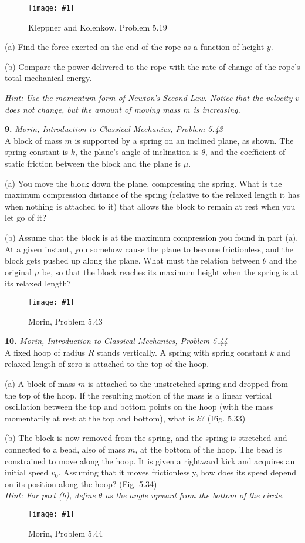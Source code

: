 \documentclass[11pt]{article}
\newcommand{\fig}[4]{
    \begin{figure}[H]
        \centering
        \texttt{[image: \#1]}
        \caption{#2}
        \label{exp4fit}
    \end{figure}
}
\theoremstyle{gangnamstyle}{\newtheorem{definition}{Definition}[]}
\theoremstyle{gangnamstyle}{\newtheorem{example}{Example}[]}
\theoremstyle{gangnamstyle}{\newtheorem{problem}{Problem}[]}
\begin{document}
\fig{figs/0716/kk519.png}{Kleppner and Kolenkow, Problem 5.19}{0.5}{0}

(a) Find the force exerted on the end of the rope as a function of height $y$. 

(b) Compare the power delivered to the rope with the rate of change of the rope’s total mechanical energy. 

\textit{Hint: Use the momentum form of Newton's Second Law. Notice that the velocity $v$ does not change, but the amount of moving mass $m$ is increasing. }

\pagebreak

\textbf{9.} \textit{Morin, Introduction to Classical Mechanics, Problem 5.43} \\
A block of mass $m$ is supported by a spring on an inclined plane, as shown. The spring constant is $k$, the plane’s angle of inclination is $\theta$, and the coefficient of static friction between the block and the plane is $\mu$.

(a) You move the block down the plane, compressing the spring. What is the maximum compression distance of the spring (relative to the relaxed length it has when nothing is attached to it) that allows the block to remain at rest when you let go of it?

(b) Assume that the block is at the maximum compression you found in part (a). At a given instant, you somehow cause the plane to become frictionless, and the block gets pushed up along the plane. What must the relation between $\theta$ and the original $\mu$ be, so that the block reaches its maximum height when the spring is at its relaxed length?
\fig{figs/0716/m543.png}{Morin, Problem 5.43}{0.65}{0}

\pagebreak

\textbf{10.} \textit{Morin, Introduction to Classical Mechanics, Problem 5.44} \\
A fixed hoop of radius $R$ stands vertically. A spring with spring constant $k$ and relaxed length of zero is attached to the top of the hoop.

(a) A block of mass $m$ is attached to the unstretched spring and
dropped from the top of the hoop. If the resulting motion of the
mass is a linear vertical oscillation between the top and bottom
points on the hoop (with the mass momentarily at rest at the top and bottom), what is $k$? (Fig. 5.33)

(b) The block is now removed from the spring, and the spring is
stretched and connected to a bead, also of mass $m$, at the bottom
of the hoop. The bead is constrained to move along the hoop. It is given a rightward kick and acquires an initial speed $v_0$. Assuming that it moves frictionlessly, how does its speed depend on its position along the hoop? (Fig. 5.34) \\
\textit{Hint: For part (b), define $\theta$ as the angle upward from the bottom of the circle. }
\fig{figs/0716/m544.png}{Morin, Problem 5.44}{0.65}{0}
\end{document}
